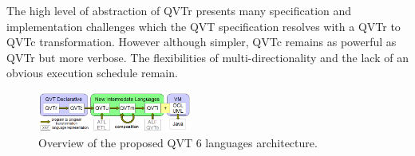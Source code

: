 
The high level of abstraction of QVTr presents many specification and implementation challenges which the QVT \cite{QVT1.1} specification resolves with a QVTr to QVTc transformation. However although simpler, QVTc remains as powerful as QVTr but more verbose. The flexibilities of multi-directionality and the lack of an obvious execution schedule remain.

\begin{figure}[h]
	\centering
	\includegraphics[width=0.45\textwidth]{QVThorizontalAlphabet.png}
	\caption{Overview of the proposed QVT 6 languages architecture.}
	\label{fig:overview}
\end{figure}



